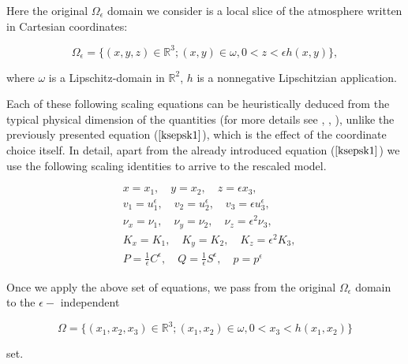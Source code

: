\documentclass[11pt]{article}
\begin{document}
Here the original $\Omega_\epsilon$ domain we consider is a local slice of the atmosphere written in Cartesian coordinates:

\begin{equation}
  \Omega_{\epsilon} = \{(x,y,z) \in \mathbb{R}^3 ; (x,y) \in \omega, 0 < z < \epsilon h(x,y) \},
\end{equation}

where $\omega$ is a Lipschitz-domain in $\mathbb{R}^2$, $h$ is a nonnegative Lipschitzian application.

Each of these following scaling equations can be heuristically deduced from the typical physical dimension of the quantities (for more details see \cite{besson1992some}, \cite{azerad2001mathematical}, \cite{pollatmws2019}), unlike the previously presented equation ($\ref{ksepsk1}$), which is the effect of the coordinate choice itself. In detail, apart from the already introduced equation ($\ref{ksepsk1}$) we use the following scaling identities to arrive to the rescaled model.

\begin{equation} \label{shallownessscalingeqs}
  \begin{split}
    & x = x_1, \quad y = x_2, \quad z = \epsilon x_3, \\
    & v_1 = u_1^{\epsilon}, \quad v_2 = u_2^{\epsilon}, \quad v_3 = \epsilon u_3^{\epsilon}, \\
    & \nu_x = \nu_1, \quad \nu_y = \nu_2 , \quad \nu_z = \epsilon ^ 2\nu_3, \\
    & K_x = K_1, \quad K_y = K_2 , \quad K_z = \epsilon^2 K_3, \\
    & P = \frac{1}{\epsilon} C^\epsilon, \quad Q = \frac{1}{\epsilon} S^\epsilon, \quad p = p^{\epsilon}
  \end{split}
\end{equation}

Once we apply the above set of equations, we pass from the original $\Omega_\epsilon$ domain to the $\epsilon-$ independent

\begin{equation} \Omega =  \{(x_1,x_2,x_3) \in \mathbb{R}^3 ; (x_1,x_2) \in \omega, 0 < x_3 < h (x_1 , x_2) \} \end{equation}

set.
\end{document}
